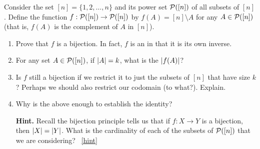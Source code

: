 \documentclass{book}
\begin{document}
\setcounter{project}{75}
\addtocounter{project}{-1}
\begin{activity}[]\label{act-pascalsym-bij}
\hypertarget{p-598}{}%
Consider the set \([n] = \{1,2,\ldots,n\}\) and its power set \(\mathcal P([n])\) of all subsets of \([n]\).  Define the function \(f:\mathcal P([n]) \to \mathcal P([n])\) by \(f(A) = [n]\setminus A\) for any \(A \in \mathcal P([n])\) (that is, \(f(A)\) is the complement of \(A\) in \([n]\)).%
\begin{enumerate}[font=\bfseries,label=(\alph*),ref=\alph*]
\item\label{task-108} \hypertarget{p-599}{}%
Prove that \(f\) is a bijection.  In fact, \(f\) is an  in that it is its own inverse.%
\item\label{task-109} \hypertarget{p-600}{}%
For any set \(A \in \mathcal P([n])\), if \(\left| A \right| = k\), what is the \(\left| f(A) \right|\)?%
\item\label{task-110} \hypertarget{p-601}{}%
Is \(f\) still a bijection if we restrict it to just the subsets of \([n]\) that have size \(k\)?  Perhaps we should also restrict our codomain (to what?).  Explain.%
\item\label{task-111} \hypertarget{p-602}{}%
Why is the above enough to establish the identity?%
\par\smallskip%
\noindent\textbf{Hint.}\hypertarget{hint-31}{}\quad%
\hypertarget{p-603}{}%
Recall the bijection principle tells us that if \(f:X \to Y\) is a bijection, then \(\left| X \right| = \left| Y \right|\).  What is the cardinality of each of the subsets of \(\mathcal P([n])\) that we are considering?%
~\hfill{\tiny\hyperlink{a-75.d}{[hint]}\hypertarget{q-75.d}{}}\end{enumerate}
\end{activity}
\end{document}
